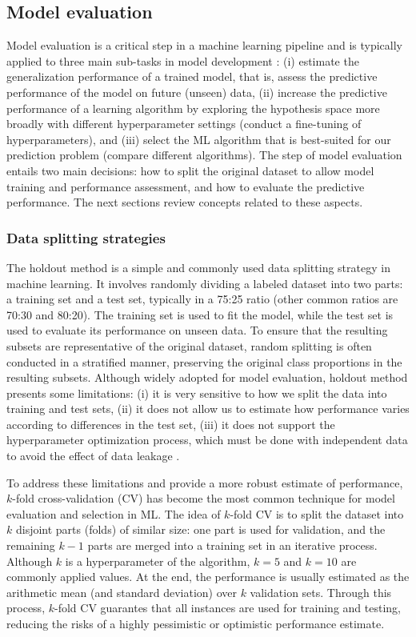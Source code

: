 \subsection{Model evaluation}
\label{sec:background_modelEvaluation}


Model evaluation is a critical step in a machine learning pipeline and is typically applied to three main sub-tasks in model development \cite{raschka2018model}: (i) estimate the generalization performance of a trained model, that is, assess the predictive performance of the model on future (unseen) data, (ii) increase the predictive performance of a learning algorithm by exploring the hypothesis space more broadly with different hyperparameter settings (\ie conduct a fine-tuning of hyperparameters), and (iii) select the ML algorithm that is best-suited for our prediction problem (\ie compare different algorithms). The step of model evaluation entails two main decisions: how to split the original dataset to allow model training and performance assessment, and how to evaluate the predictive performance. The next sections review concepts related to these aspects.

\subsubsection{Data splitting strategies}

The holdout method is a simple and commonly used data splitting strategy in machine learning. It involves randomly dividing a labeled dataset into two parts: a training set and a test set, typically in a 75:25 ratio (other common ratios are 70:30 and 80:20). The training set is used to fit the model, while the test set is used to evaluate its performance on unseen data. To ensure that the resulting subsets are representative of the original dataset, random splitting is often conducted in a stratified manner, preserving the original class proportions in the resulting subsets. Although widely adopted for model evaluation, holdout method presents some limitations: (i) it is very sensitive to how we split the data into training and test sets, (ii) it does not allow us to estimate how performance varies according to differences in the test set, (iii) it does not support the hyperparameter optimization process, which must be done with independent data to avoid the effect of data leakage \cite{raschka2018model}.


To address these limitations and provide a more robust estimate of performance, $k$-fold cross-validation (CV) has become the most common technique for model evaluation and selection in ML. The idea of $k$-fold CV is to split the dataset into $k$ disjoint parts (\ie folds) of similar size: one part is used for validation, and the remaining $k - 1$ parts are merged into a training set in an iterative process. Although $k$ is a hyperparameter of the algorithm, $k = 5$ and $k = 10$ are commonly applied values. At the end, the performance is usually estimated as the arithmetic mean (and standard deviation) over $k$ validation sets. Through this process, $k$-fold CV guarantes that all instances are used for training and testing, reducing the risks of a highly pessimistic or optimistic performance estimate.

